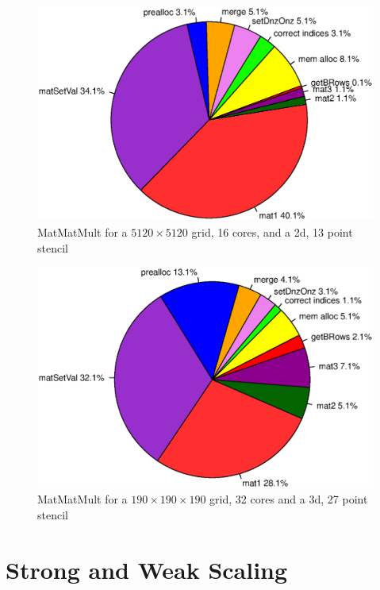 \begin{figure}[tbp]
	\centering
	\includegraphics[width=1\textwidth, trim={0 3.cm 0 3cm},clip]{16cores_5120}
	\caption{MatMatMult for a $5120 \times 5120$ grid, 16 cores, and a 2d, 13 point stencil} 
	\label{fig:pie_16_5120}
\end{figure}


\begin{figure}[tbp]
	\centering
	\includegraphics[width=1\textwidth, trim={0 3.cm 0 3cm},clip]{32cores_190}
	\caption{MatMatMult for a $190 \times 190 \times 190$ grid, 32 cores and a 3d, 27 point stencil} 
	\label{fig:pie_32_190}
\end{figure}


\newpage
\section{Strong and Weak Scaling}

